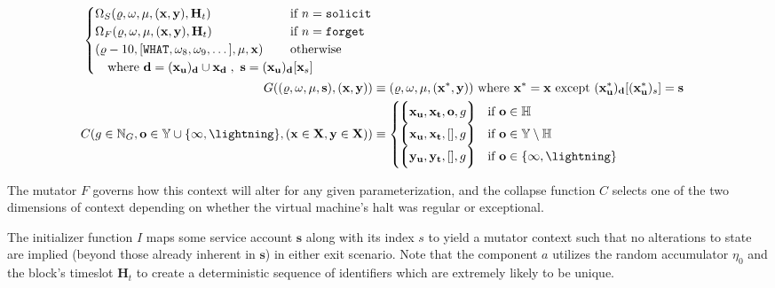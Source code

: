 \begin{align}
\begin{cases}
    \Omega_S(\gascounter, \registers, \memory, (\mathbf{x}, \mathbf{y}), \mathbf{H}_t) &\when n = \mathtt{solicit} \\
    \Omega_F(\gascounter, \registers, \memory, (\mathbf{x}, \mathbf{y}), \mathbf{H}_t) &\when n = \mathtt{forget} \\
    (\gascounter - 10, [\mathtt{WHAT}, \registers_8, \registers_9, \dots], \memory, \mathbf{x}) &\otherwise\\
    \quad \where \mathbf{d} = (\mathbf{x}_\mathbf{u})_\mathbf{d}\cup\mathbf{x}_\mathbf{d}\;,\ \mathbf{s} = (\mathbf{x}_\mathbf{u})_\mathbf{d}[\mathbf{x}_s]\!\!\!\!\!\!\!\!\!\!\!\!\!\!\!\!\!& \\
  \end{cases} \\
  G((\gascounter, \registers, \memory, \mathbf{s}), (\mathbf{x}, \mathbf{y})) &\equiv (\gascounter, \registers, \memory, (\mathbf{x}^*, \mathbf{y}))\ \where \mathbf{x}^* = \mathbf{x} \exc (\mathbf{x}^*_\mathbf{u})_\mathbf{d}[(\mathbf{x}^*_\mathbf{u})_s] = \mathbf{s} \\
  C(g \in \N_G, \mathbf{o} \in \mathbb{Y} \cup \{\oog, \panic\}, (\mathbf{x}\in\mathbf{X}, \mathbf{y}\in\mathbf{X})) &\equiv \begin{cases}
    \tup{
      \mathbf{x}_\mathbf{u},
      \mathbf{x}_\mathbf{t},
      \mathbf{o},
      g
    } & \when \mathbf{o} \in \mathbb{H} \\
    \tup{
      \mathbf{x}_\mathbf{u},
      \mathbf{x}_\mathbf{t},
      [],
      g
    } & \when \mathbf{o} \in \mathbb{Y} \setminus \H \\
    \tup{
      \mathbf{y}_\mathbf{u},
      \mathbf{y}_\mathbf{t},
      [],
      g
    } & \when \mathbf{o} \in \{\oog, \panic\} \\
  \end{cases}
\end{align}

The mutator $F$ governs how this context will alter for any given parameterization, and the collapse function $C$ selects one of the two dimensions of context depending on whether the virtual machine's halt was regular or exceptional.

The initializer function $I$ maps some service account $\mathbf{s}$ along with its index $s$ to yield a mutator context such that no alterations to state are implied (beyond those already inherent in $\mathbf{s}$) in either exit scenario. Note that the component $a$ utilizes the random accumulator $\eta_0$ and the block's timeslot $\mathbf{H}_t$ to create a deterministic sequence of identifiers which are extremely likely to be unique.

